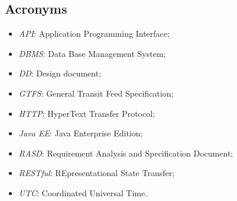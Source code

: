 \subsection{Acronyms}
	\begin{itemize}
	\item \textit{API}: Application Programming Interface;
	\item \textit{DBMS}: Data Base Management System;
	\item \textit{DD}: Design document;
	\item \textit{GTFS}: General Transit Feed Specification;
	\item \textit{HTTP}: HyperText Transfer Protocol;
	\item \textit{Java EE}: Java Enterprise Edition;
	\item \textit{RASD}: Requirement Analysis and Specification Document;
	\item \textit{RESTful}: REpresentational State Transfer;
	\item \textit{UTC}: Coordinated Universal Time.
	\end{itemize}
	
